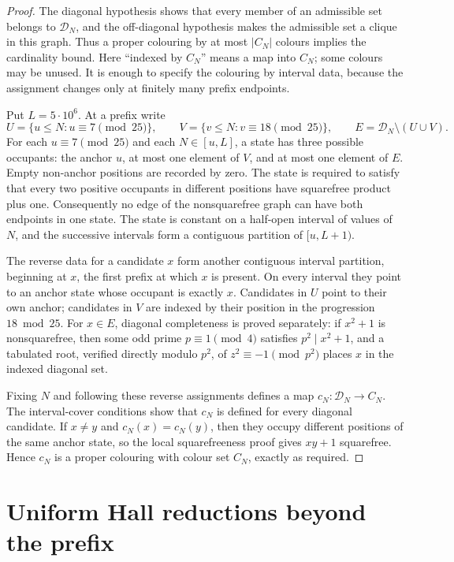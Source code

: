 \documentclass[11pt]{article}
\theoremstyle{definition}
\newcommand{\CN}{C_N}
\newcommand{\FiveMillion}{5\cdot10^6}
\begin{document}
\begin{proof}
The diagonal hypothesis shows that every member of an admissible set belongs
to $\mathcal D_N$, and the off-diagonal hypothesis makes the admissible set a
 clique in this graph.  Thus a proper colouring by at most $|\CN|$ colours
 implies the cardinality bound.  Here ``indexed by $\CN$'' means a map into
 $\CN$; some colours may be unused.  It is enough to specify the colouring by
interval data, because the assignment changes only at finitely many prefix
endpoints.

Put $L=\FiveMillion$.  At a prefix write
\[
 U=\{u\leq N:u\equiv7\pmod {25}\},\qquad
 V=\{v\leq N:v\equiv18\pmod {25}\},\qquad
 E=\mathcal D_N\setminus(U\cup V).
\]
For each $u\equiv7\pmod {25}$ and each $N\in[u,L]$, a state has three
possible occupants: the anchor $u$, at most one element of $V$, and at most
one element of $E$.  Empty non-anchor positions are recorded by zero.  The
 state is required to satisfy that every two positive occupants in different positions have
squarefree product plus one.  Consequently no edge of the nonsquarefree graph
can have both endpoints in one state.
The state is constant on a half-open interval of values of $N$, and the
successive intervals form a contiguous partition of $[u,L+1)$.

The reverse data for a candidate $x$ form another contiguous interval
partition, beginning at $x$, the first prefix at which $x$ is present.  On
every interval they point to an anchor state whose occupant is exactly $x$.
Candidates in $U$ point to their own anchor;
candidates in $V$ are indexed by their position in the progression
$18\bmod25$.  For $x\in E$, diagonal completeness is proved separately:
if $x^2+1$ is nonsquarefree, then some odd prime $p\equiv1\pmod4$ satisfies
$p^2\mid x^2+1$, and a tabulated root, verified directly modulo $p^2$, of
$z^2\equiv-1\pmod {p^2}$ places $x$ in the indexed diagonal set.

Fixing $N$ and following these reverse assignments defines a map
$c_N:\mathcal D_N\to\CN$.  The interval-cover conditions show that $c_N$ is
defined for every diagonal candidate.  If $x\neq y$ and $c_N(x)=c_N(y)$,
then they occupy different positions of the same anchor state, so the local
squarefreeness proof gives $xy+1$ squarefree.  Hence $c_N$ is a proper
colouring with colour set $\CN$, exactly as required.
\end{proof}

\section{Uniform Hall reductions beyond the prefix}
\end{document}
